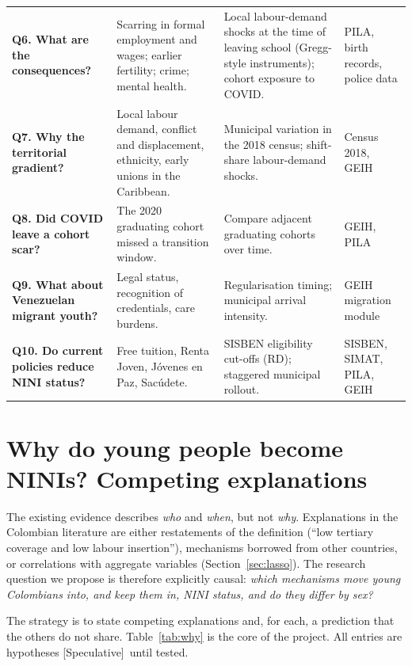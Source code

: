 \documentclass[11pt]{article}
\newcommand{\spec}{\textcolor{red!70!black}{\textsf{\footnotesize[Speculative]}}}
\begin{document}
\begin{longtable}{P{3.3cm}P{4.4cm}P{4.1cm}P{2.8cm}}
\textbf{Q6. What are the consequences?} & Scarring in formal employment and wages; earlier fertility; crime; mental health. & Local labour-demand shocks at the time of leaving school (Gregg-style instruments); cohort exposure to COVID. & PILA, birth records, police data \\
\textbf{Q7. Why the territorial gradient?} & Local labour demand, conflict and displacement, ethnicity, early unions in the Caribbean. & Municipal variation in the 2018 census; shift-share labour-demand shocks. & Census 2018, GEIH \\
\textbf{Q8. Did COVID leave a cohort scar?} & The 2020 graduating cohort missed a transition window. & Compare adjacent graduating cohorts over time. & GEIH, PILA \\
\textbf{Q9. What about Venezuelan migrant youth?} & Legal status, recognition of credentials, care burdens. & Regularisation timing; municipal arrival intensity. & GEIH migration module \\
\textbf{Q10. Do current policies reduce NINI status?} & Free tuition, Renta Joven, J\'ovenes en Paz, Sac\'udete. & SISBEN eligibility cut-offs (RD); staggered municipal rollout. & SISBEN, SIMAT, PILA, GEIH \\
\end{longtable}
\endgroup

\section{Why do young people become NINIs? Competing explanations}\label{sec:why}

The existing evidence describes \emph{who} and \emph{when}, but not \emph{why}. Explanations in the Colombian literature are either restatements of the definition (``low tertiary coverage and low labour insertion''), mechanisms borrowed from other countries, or correlations with aggregate variables (Section~\ref{sec:lasso}). The research question we propose is therefore explicitly causal: \emph{which mechanisms move young Colombians into, and keep them in, NINI status, and do they differ by sex?}

The strategy is to state competing explanations and, for each, a prediction that the others do not share. Table~\ref{tab:why} is the core of the project. All entries are hypotheses \spec\ until tested.
\end{document}
